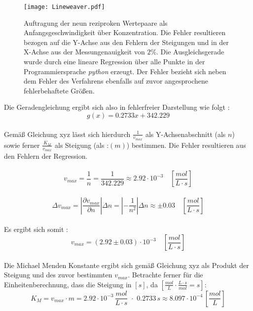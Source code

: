 \begin{figure}[H]
	\centering	
	\begin{minipage}{1\textwidth}
		\texttt{[image: Lineweaver.pdf]}
	\end{minipage}
	\caption{Auftragung der neun reziproken Wertepaare als Anfangsgeschwindigkeit über Konzentration. Die Fehler resultieren bezogen auf die Y-Achse aus den Fehlern der Steigungen und in der X-Achse aus der Messungenauigkeit von $2\%$. Die Ausgleichsgerade wurde durch eine lineare Regression über alle Punkte in der Programmiersprache \textit{python} erzeugt. Der Fehler bezieht sich neben dem Fehler des Verfahrens ebenfalls auf zuvor angesprochene fehlerbehaftete Größen.}
	\label{Lineweaver}
\end{figure}
Die Geradengleichung ergibt sich also in fehlerfreier Darstellung wie folgt : 
\begin{equation}
g(x) = 0.2733 x + 342.229
\label{Geradengleichung}
\end{equation}\\
Gemäß Gleichung xyz lässt sich hierdurch $\frac{1}{v_{max}}$ als Y-Achsenabschnitt (als $n$) sowie ferner $\frac{K_M}{v_{max}}$ als Steigung (als :$(m)$) bestimmen. Die Fehler resultieren aus den Fehlern der Regression.\\
\\
\begin{equation}
v_{max} = \frac{1}{n} = \frac{1}{342.229} \approx 2.92\cdot 10^{-3} \quad [\si{\frac{mol}{L\cdot s}}]
\end{equation}
\\
\begin{equation}
\Delta v_{max} = |\frac{\partial v_{max}}{\partial n}|\Delta n = |-\frac{1}{n^2}|\Delta n \approx \pm 0.03  \quad [\si{\frac{mol}{L\cdot s}}]
\end{equation}
\\
Es ergibt sich somit : 
\begin{equation}
v_{max} = (2.92 \pm 0.03 )\cdot 10^{-3}  \quad [\si{\frac{mol}{L\cdot s}}]
\end{equation}\\
Die Michael Menden Konstante ergibt sich gemäß Gleichung xyz als Produkt der Steigung und des zuvor bestimmten $v_{max}$. Betrachte ferner für die Einheitenberechnung, dass die Steigung in $  [\si{s}]$, da $ [\si{\frac{mol}{L}\cdot \frac{L\cdot s}{mol} = s}]$: 
\begin{equation}
K_M = v_{max} \cdot m = 2.92 \cdot 10^{-3} \, \si{\frac{mol}{L\cdot s}}\,\, \cdot \,\,0.2733  \,\si{s} \approx 8.097 \cdot 10^{-4} \, [\si{\frac{mol}{L}}]
\end{equation}\\

